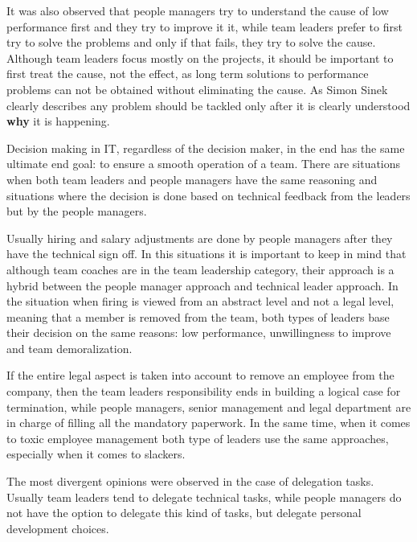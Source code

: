 It was also observed that people managers try to understand the cause of low performance first and they try to improve it it, while team leaders prefer to first try to solve the problems and only if that fails, they try to solve the cause. Although team leaders focus mostly on the projects, it should be important to first treat the cause, not the effect, as long term solutions to performance problems can not be obtained without eliminating the cause. As Simon Sinek clearly describes \cite{why} any problem should be tackled only after it is clearly understood \textbf{why} it is happening.

Decision making in IT, regardless of the decision maker, in the end has the same ultimate end goal: to ensure a smooth operation of a team. There are situations when both team leaders and people managers have the same reasoning and situations where the decision is done based on technical feedback from the leaders but by the people managers.

 Usually hiring and salary adjustments are done by people managers after they have the technical sign off. In this situations it is important to keep in mind that although team coaches are in the team leadership category, their approach is a hybrid between the people manager approach and technical leader approach. In the situation when firing is viewed from an abstract level and not a legal level, meaning that a member is removed from the team, both types of leaders base their decision on the same reasons: low performance, unwillingness to improve and team demoralization. 
 
If the entire legal aspect is taken into account to remove an employee from the company, then the team leaders responsibility ends in building a logical case for termination, while people managers, senior management and legal department are in charge of filling all the mandatory paperwork. In the same time, when it comes to toxic employee management both type of leaders use the same approaches, especially when it comes to slackers.

The most divergent opinions were observed in the case of delegation tasks. Usually team leaders tend to delegate technical tasks, while people managers do not have the option to delegate this kind of tasks, but delegate personal development choices.